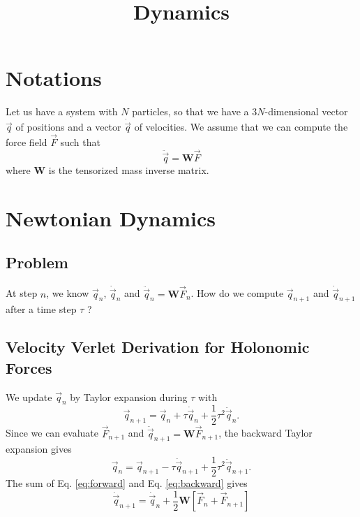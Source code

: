 \documentclass[11pt,aps,twocolumn]{revtex4}
\newcommand{\mymat}[1]{\boldsymbol{#1}}
\newcommand{\q}{\vec{q}}
\newcommand{\dq}{\dot{\q}}
\newcommand{\ddq}{\ddot{\q}}
\begin{document}
\title{Dynamics}

\section{Notations}
Let us have a system with $N$ particles, so that we have a $3N$-dimensional
vector $\q$ of positions and a vector $\dq$ of velocities.
We assume that we can compute the force field $\vec{F}$ such that
\begin{equation}
	\label{eq:newton}
	\ddq = \mymat{W} \vec{F}
\end{equation}
where $\mymat{W}$ is the tensorized mass inverse matrix.

\section{Newtonian Dynamics}

\subsection{Problem}
At step $n$, we know $\q_n$, $\dq_n$ and $\ddq_n = \mymat{W} \vec{F}_n$.
How do we compute $\q_{n+1}$ and $\dq_{n+1}$after a time step $\tau$ ?

\subsection{Velocity Verlet Derivation for Holonomic Forces}
We update $\q_n$ by Taylor expansion during $\tau$ with
\begin{equation}
	\label{eq:forward}
	\q_{n+1} = \q_n + \tau \dq_n + \frac{1}{2}\tau^2 \ddq_n.
\end{equation}
Since we can evaluate $\vec{F}_{n+1}$ and $\ddq_{n+1}=\mymat{W}\vec{F}_{n+1}$, the backward Taylor expansion
gives
\begin{equation}
	\label{eq:backward}
	\q_n = \q_{n+1} - \tau \dq_{n+1} + \frac{1}{2}\tau^2 \ddq_{n+1}.
\end{equation}
The sum of Eq. \eqref{eq:forward} and Eq. \eqref{eq:backward} gives 
\begin{equation}
	\label{eq:vv}
	\dq_{n+1} = \dq_{n} + \dfrac{1}{2}\mymat{W}\left\lbrack\vec{F}_n + \vec{F}_{n+1}\right\rbrack
\end{equation}
\end{document}
